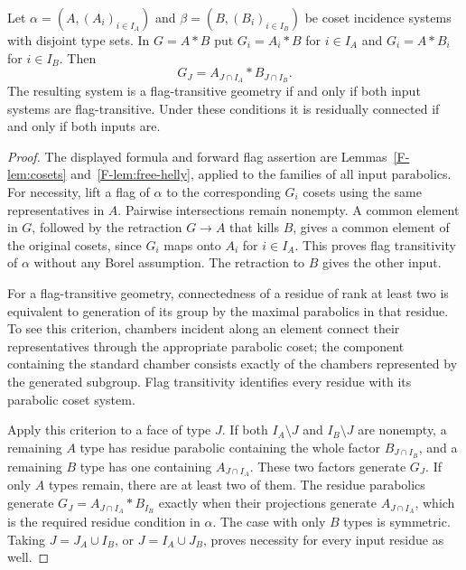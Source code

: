 \begin{theorem}\label{F-thm:free}
Let $\alpha=(A,(A_i)_{i\in I_A})$ and
$\beta=(B,(B_i)_{i\in I_B})$ be coset incidence systems with disjoint
type sets. In $G=A*B$ put $G_i=A_i*B$ for $i\in I_A$ and
$G_i=A*B_i$ for $i\in I_B$. Then
\[
 G_J=A_{J\cap I_A}*B_{J\cap I_B}.
\]
The resulting system is a flag-transitive geometry if and only if
both input systems are flag-transitive. Under these conditions it is
residually connected if and only if both inputs are.
\end{theorem}
\begin{proof}
The displayed formula and forward flag assertion are Lemmas~\ref{F-lem:cosets} and~\ref{F-lem:free-helly}, applied to the families of all input parabolics. For necessity,
lift a flag of $\alpha$ to the corresponding $G_i$ cosets using the
same representatives in $A$. Pairwise intersections remain nonempty.
A common element in $G$, followed by the retraction $G\to A$ that
kills $B$, gives a common element of the original cosets, since
$G_i$ maps onto $A_i$ for $i\in I_A$. This proves flag transitivity
of $\alpha$ without any Borel assumption. The retraction to $B$
gives the other input.

For a flag-transitive geometry, connectedness of a residue of rank at
least two is equivalent to generation of its group by the maximal
parabolics in that residue. To see this criterion, chambers incident
along an element connect their representatives through the appropriate
parabolic coset; the component containing the standard chamber consists
exactly of the chambers represented by the generated subgroup. Flag
transitivity identifies every residue with its parabolic coset system.

Apply this criterion to a face of type $J$. If both
$I_A\setminus J$ and $I_B\setminus J$ are nonempty, a remaining
$A$ type has residue parabolic containing the whole factor
$B_{J\cap I_B}$, and a remaining $B$ type has one containing
$A_{J\cap I_A}$. These two factors generate $G_J$. If only $A$
types remain, there are at least two of them. The residue parabolics
generate $G_J=A_{J\cap I_A}*B_{I_B}$ exactly when their projections
generate $A_{J\cap I_A}$, which is the required residue condition
in $\alpha$. The case with only $B$ types is symmetric. Taking
$J=J_A\cup I_B$, or $J=I_A\cup J_B$, proves necessity for every
input residue as well.
\end{proof}

